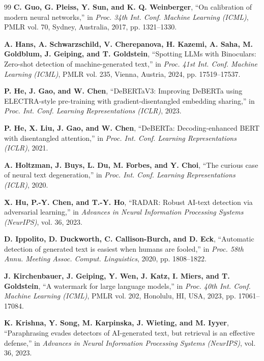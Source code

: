 \begin{thebibliography}{99}
\textbf{C. Guo, G. Pleiss, Y. Sun, and K. Q. Weinberger}, ``On calibration of modern neural networks,'' in \textit{Proc. 34th Int. Conf. Machine Learning (ICML)}, PMLR vol. 70, Sydney, Australia, 2017, pp. 1321--1330.

\textbf{A. Hans, A. Schwarzschild, V. Cherepanova, H. Kazemi, A. Saha, M. Goldblum, J. Geiping, and T. Goldstein}, ``Spotting LLMs with Binoculars: Zero-shot detection of machine-generated text,'' in \textit{Proc. 41st Int. Conf. Machine Learning (ICML)}, PMLR vol. 235, Vienna, Austria, 2024, pp. 17519--17537.

\textbf{P. He, J. Gao, and W. Chen}, ``DeBERTaV3: Improving DeBERTa using ELECTRA-style pre-training with gradient-disentangled embedding sharing,'' in \textit{Proc. Int. Conf. Learning Representations (ICLR)}, 2023.

\textbf{P. He, X. Liu, J. Gao, and W. Chen}, ``DeBERTa: Decoding-enhanced BERT with disentangled attention,'' in \textit{Proc. Int. Conf. Learning Representations (ICLR)}, 2021.

\textbf{A. Holtzman, J. Buys, L. Du, M. Forbes, and Y. Choi}, ``The curious case of neural text degeneration,'' in \textit{Proc. Int. Conf. Learning Representations (ICLR)}, 2020.

\textbf{X. Hu, P.-Y. Chen, and T.-Y. Ho}, ``RADAR: Robust AI-text detection via adversarial learning,'' in \textit{Advances in Neural Information Processing Systems (NeurIPS)}, vol. 36, 2023.

\textbf{D. Ippolito, D. Duckworth, C. Callison-Burch, and D. Eck}, ``Automatic detection of generated text is easiest when humans are fooled,'' in \textit{Proc. 58th Annu. Meeting Assoc. Comput. Linguistics}, 2020, pp. 1808--1822.

\textbf{J. Kirchenbauer, J. Geiping, Y. Wen, J. Katz, I. Miers, and T. Goldstein}, ``A watermark for large language models,'' in \textit{Proc. 40th Int. Conf. Machine Learning (ICML)}, PMLR vol. 202, Honolulu, HI, USA, 2023, pp. 17061--17084.

\textbf{K. Krishna, Y. Song, M. Karpinska, J. Wieting, and M. Iyyer}, ``Paraphrasing evades detectors of AI-generated text, but retrieval is an effective defense,'' in \textit{Advances in Neural Information Processing Systems (NeurIPS)}, vol. 36, 2023.


\end{thebibliography}
